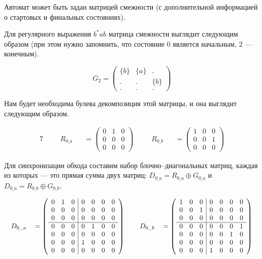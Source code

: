 \begin{example}
Автомат может быть задан матрицей смежности (с дополнительной информацией о стартовых и финальных состояниях).

Для регулярного выражения $b^*ab$ матрица смежности выглядит следующим образом (при этом нужно запомнить, что
состояние $0$ является начальным, $2$ --- конечным).

\[ G_2 =
\begin{pmatrix}
\{b\} & \{a\} & . \\
. & . & \{b\} \\
. & . & . 
\end{pmatrix}
\]

Нам будет необходима булева декомпозиция этой матрицы, и она выглядит следующим образом.

\begin{alignat*}{7}
  & &&R_{0\_a} &&= \begin{pmatrix}
    0 & 1 & 0 \\
    0 & 0 & 0 \\
    0 & 0 & 0 
    \end{pmatrix} \ \ \ \ &&R_{0\_b} &&= \begin{pmatrix}
      1 & 0 & 0 \\
      0 & 0 & 1 \\
      0 & 0 & 0 
      \end{pmatrix}
\end{alignat*}

Для синхронизации обхода составим набор блочно--диагональных матриц, каждая из которых --- это прямая сумма двух матриц:
$D_{0\_a} = R_{0\_a} \oplus G_{0\_a}$ и $D_{0\_a} = R_{0\_b} \oplus G_{0\_b}$.

\begin{alignat*}{7}
  & &&D_{0\_a} &&=
  \left(\begin{array}{c c c | c c c c}
    0 & 1 & 0 & 0 & 0 & 0 & 0 \\
    0 & 0 & 0 & 0 & 0 & 0 & 0 \\
    0 & 0 & 0 & 0 & 0 & 0 & 0 \\
    \hline
    0 & 0 & 0 & 0 & 1 & 0 & 0 \\
    0 & 0 & 0 & 0 & 0 & 0 & 0 \\
    0 & 0 & 0 & 1 & 0 & 0 & 0 \\
    0 & 0 & 0 & 0 & 0 & 0 & 0 
    \end{array}\right)
   \ \ \ \ &&D_{0\_b} &&=
   \left(\begin{array}{c c c | c c c c}
      1 & 0 & 0 & 0 & 0 & 0 & 0 \\
      0 & 0 & 1 & 0 & 0 & 0 & 0 \\
      0 & 0 & 0 & 0 & 0 & 0 & 0 \\
      \hline
      0 & 0 & 0 & 0 & 0 & 0 & 1 \\
      0 & 0 & 0 & 0 & 0 & 1 & 0 \\
      0 & 0 & 0 & 0 & 0 & 0 & 0 \\
      0 & 0 & 0 & 1 & 0 & 0 & 0 
      \end{array}\right)
\end{alignat*}


\end{example}
